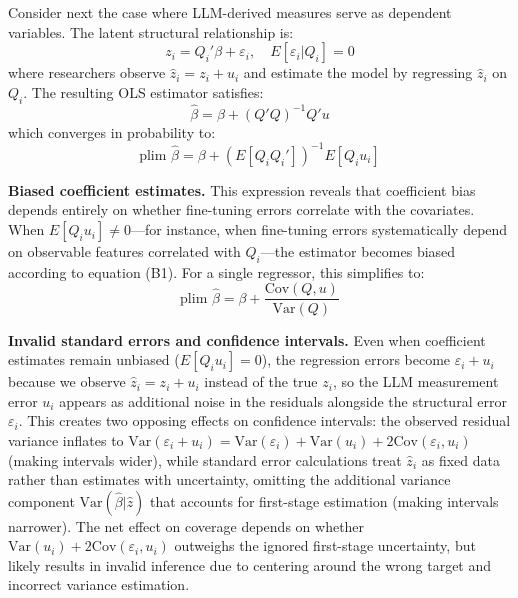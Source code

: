 \documentclass[11pt]{article}
\begin{document}
Consider next the case where LLM-derived measures serve as dependent variables. The latent structural relationship is:
\begin{equation}
z_i = Q_i'\beta + \varepsilon_i, \quad E[\varepsilon_i | Q_i] = 0
\end{equation}
where researchers observe $\hat{z}_i = z_i + u_i$ and estimate the model by regressing $\hat{z}_i$ on $Q_i$. The resulting OLS estimator satisfies:
\begin{equation}
\hat{\beta} = \beta + (Q'Q)^{-1}Q'u
\end{equation}
which converges in probability to:
\begin{equation}
\text{plim } \hat{\beta} = \beta + (E[Q_i Q_i'])^{-1} E[Q_i u_i] \tag{B1}
\end{equation}

\textbf{Biased coefficient estimates.} This expression reveals that coefficient bias depends entirely on whether fine-tuning errors correlate with the covariates. When $E[Q_i u_i] \neq 0$—for instance, when fine-tuning errors systematically depend on observable features correlated with $Q_i$—the estimator becomes biased according to equation (B1). For a single regressor, this simplifies to:
\begin{equation}
\text{plim } \hat{\beta} = \beta + \frac{\text{Cov}(Q, u)}{\text{Var}(Q)} \tag{B2}
\end{equation}

\textbf{Invalid standard errors and confidence intervals.} Even when coefficient estimates remain unbiased ($E[Q_i u_i] = 0$), 
the regression errors become $\varepsilon_i + u_i$ because we observe $\hat{z}_i = z_i + u_i$ instead of the true $z_i$, 
so the LLM measurement error $u_i$ appears as additional noise in the residuals alongside the structural error $\varepsilon_i$. 
This creates two opposing effects on confidence intervals: the observed residual variance 
inflates to $\text{Var}(\varepsilon_i + u_i) = \text{Var}(\varepsilon_i) + \text{Var}(u_i) + 2\text{Cov}(\varepsilon_i, u_i)$ (making intervals wider), 
while standard error calculations treat $\hat{z}_i$ as fixed data rather than estimates with uncertainty,
omitting the additional variance component $\text{Var}(\hat{\beta} | \hat{z})$ that accounts for first-stage estimation (making intervals narrower). 
The net effect on coverage depends on whether $\text{Var}(u_i) + 2\text{Cov}(\varepsilon_i, u_i)$ outweighs the ignored first-stage uncertainty,
but likely results in invalid inference due to centering around the wrong target and incorrect variance estimation.
\end{document}
